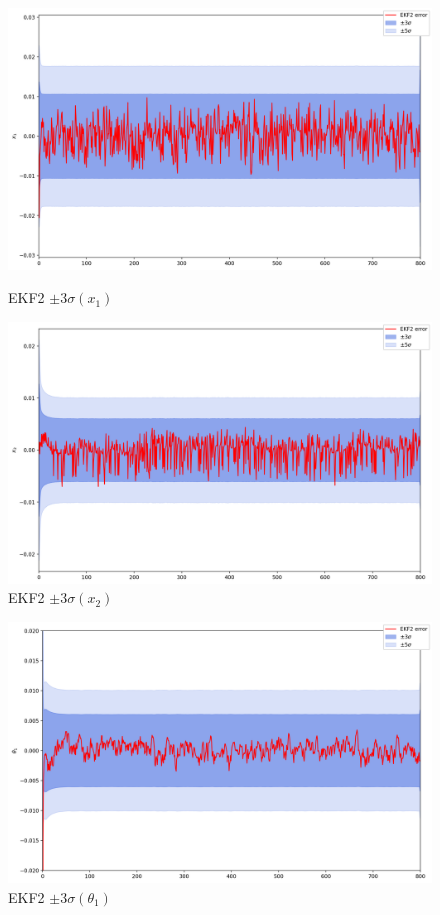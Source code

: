 \documentclass[a4paper,12pt]{article}
\begin{document}
\begin{landscape}
\begin{figure}[p]
\centering
\caption{EKF2 $\pm 3\sigma(x_1)$}
\includegraphics[width=0.95\linewidth]{EKF2_err_x1.png}
\label{fig:x1_ci}
\end{figure}

\begin{figure}[p]
\centering
\caption{EKF2 $\pm 3\sigma(x_2)$}
\includegraphics[width=0.95\linewidth]{EKF2_err_x2.png}
\end{figure}

\begin{figure}[p]
\centering
\caption{EKF2 $\pm 3\sigma(\theta_1)$}
\includegraphics[width=0.95\linewidth]{EKF2_err_theta1.png}
\end{figure}


\end{landscape}
\end{document}
